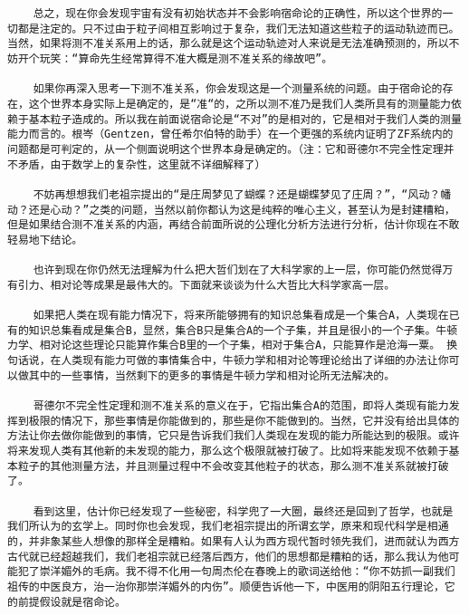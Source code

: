 \begin{verbatim}
    总之，现在你会发现宇宙有没有初始状态并不会影响宿命论的正确性，所以这个世界的一切都是注定的。只不过由于粒子间相互影响过于复杂，我们无法知道这些粒子的运动轨迹而已。当然，如果将测不准关系用上的话，那么就是这个运动轨迹对人来说是无法准确预测的，所以不妨开个玩笑：“算命先生经常算得不准大概是测不准关系的缘故吧”。

    如果你再深入思考一下测不准关系，你会发现这是一个测量系统的问题。由于宿命论的存在，这个世界本身实际上是确定的，是“准“的，之所以测不准乃是我们人类所具有的测量能力依赖于基本粒子造成的。所以我在前面说宿命论是“不对”的是相对的，它是相对于我们人类的测量能力而言的。根岑（Gentzen，曾任希尔伯特的助手）在一个更强的系统内证明了ZF系统内的问题都是可判定的，从一个侧面说明这个世界本身是确定的。（注：它和哥德尔不完全性定理并不矛盾，由于数学上的复杂性，这里就不详细解释了）

    不妨再想想我们老祖宗提出的“是庄周梦见了蝴蝶？还是蝴蝶梦见了庄周？”，“风动？幡动？还是心动？”之类的问题，当然以前你都认为这是纯粹的唯心主义，甚至认为是封建糟粕，但是如果结合测不准关系的内涵，再结合前面所说的公理化分析方法进行分析，估计你现在不敢轻易地下结论。

    也许到现在你仍然无法理解为什么把大哲们划在了大科学家的上一层，你可能仍然觉得万有引力、相对论等成果是最伟大的。下面就来谈谈为什么大哲比大科学家高一层。

    如果把人类在现有能力情况下，将来所能够拥有的知识总集看成是一个集合A，人类现在已有的知识总集看成是集合B，显然，集合B只是集合A的一个子集，并且是很小的一个子集。牛顿力学、相对论这些理论只能算作集合B里的一个子集，相对于集合A，只能算作是沧海一粟。 换句话说，在人类现有能力可做的事情集合中，牛顿力学和相对论等理论给出了详细的办法让你可以做其中的一些事情，当然剩下的更多的事情是牛顿力学和相对论所无法解决的。

    哥德尔不完全性定理和测不准关系的意义在于，它指出集合A的范围，即将人类现有能力发挥到极限的情况下，那些事情是你能做到的，那些是你不能做到的。当然，它并没有给出具体的方法让你去做你能做到的事情，它只是告诉我们我们人类现在发现的能力所能达到的极限。或许将来发现人类有其他新的未发现的能力，那么这个极限就被打破了。比如将来能发现不依赖于基本粒子的其他测量方法，并且测量过程中不会改变其他粒子的状态，那么测不准关系就被打破了。

    看到这里，估计你已经发现了一些秘密，科学兜了一大圈，最终还是回到了哲学，也就是我们所认为的玄学上。同时你也会发现，我们老祖宗提出的所谓玄学，原来和现代科学是相通的，并非象某些人想像的那样全是糟粕。如果有人认为西方现代暂时领先我们，进而就认为西方古代就已经超越我们，我们老祖宗就已经落后西方，他们的思想都是糟粕的话，那么我认为他可能犯了崇洋媚外的毛病。我不得不化用一句周杰伦在春晚上的歌词送给他：“你不妨抓一副我们祖传的中医良方，治一治你那崇洋媚外的内伤”。顺便告诉他一下，中医用的阴阳五行理论，它的前提假设就是宿命论。


\end{verbatim}
